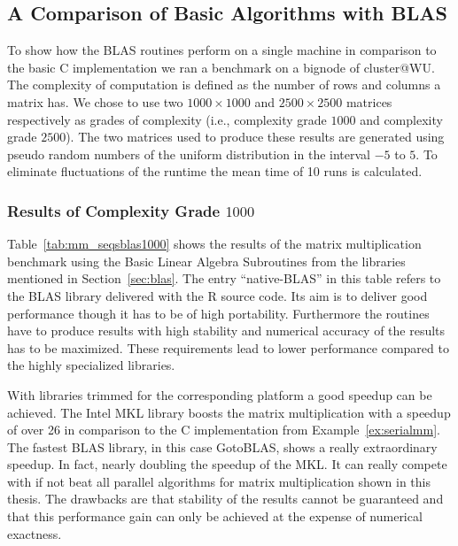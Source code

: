 


\subsection{A Comparison of Basic Algorithms with BLAS}

To show how the BLAS routines perform on a single machine in
comparison to the basic C implementation we ran a benchmark on a
bignode of cluster@WU. The complexity of computation is defined as the
number of rows and columns a matrix has. We chose to use two $1000
\times 1000$  and $2500 \times
2500$ matrices respectively as grades of complexity (i.e., complexity
grade $1000$ and complexity grade $2500$). The two matrices used to
produce these results are generated using pseudo random numbers
of the uniform
distribution in the interval $-5$ to $5$. To eliminate fluctuations of the
runtime the mean time of 10 runs is calculated.

\subsubsection{Results of Complexity Grade $1000$}

Table~\ref{tab:mm_seqsblas1000} shows the results of the matrix
multiplication benchmark using the Basic Linear Algebra Subroutines
from the libraries mentioned in Section~\ref{sec:blas}. The entry
``native-BLAS'' in this table refers to the BLAS library delivered
with the R source code. Its aim is to deliver good performance though
it has to be of high portability. Furthermore the routines have to
produce results with high stability and numerical accuracy of the
results has to be maximized. These requirements lead to lower
performance compared to the highly specialized libraries.

 
With libraries trimmed for the
corresponding platform a good speedup can be achieved. The Intel MKL
library boosts the matrix multiplication with a speedup of over 26 in
comparison to the C implementation from Example~\ref{ex:serialmm}. The
fastest BLAS library, in 
this case GotoBLAS, shows a really extraordinary speedup. In fact,
nearly doubling the speedup of the MKL. It
can really compete with if not beat all parallel algorithms for matrix
multiplication shown in this thesis. The drawbacks are that stability
of the results cannot be guaranteed and that this performance gain can
only be achieved at the expense of numerical exactness.

